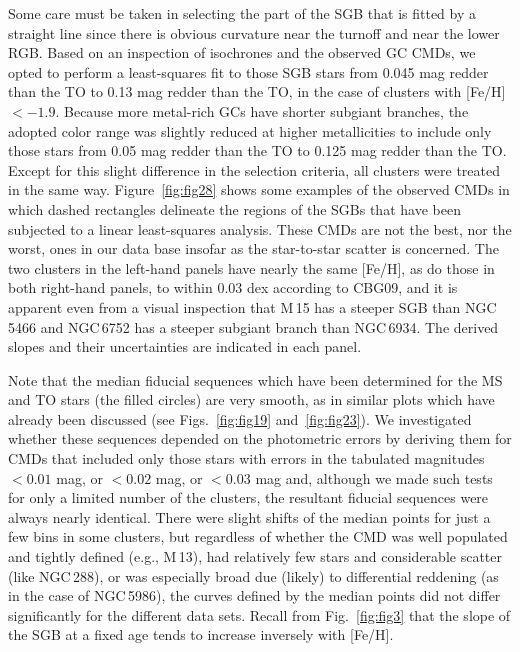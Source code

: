 \documentclass[12pt,preprint]{aastex}
\begin{document}
Some care must be taken in selecting the part of the SGB that is fitted by a
straight line since there is obvious curvature near the turnoff and near the
lower RGB.  Based on an inspection of isochrones and the observed GC CMDs, we
opted to perform a least-squares fit to those SGB stars from 0.045 mag redder
than the TO to 0.13 mag redder than the TO, in the case of clusters with [Fe/H]
$< -1.9$.  Because more metal-rich GCs have shorter subgiant branches, the
adopted color range was slightly reduced at higher metallicities to include
only those stars from 0.05 mag redder than the TO to 0.125 mag redder than the
TO.  Except for this slight difference in the selection criteria, all clusters
were treated in the same way.  Figure~\ref{fig:fig28} shows some examples of
the observed CMDs in which dashed rectangles delineate the regions of the SGBs
that have been subjected to a linear least-squares analysis.  These CMDs are
not the best, nor the worst, ones in our data base insofar as the star-to-star
scatter is concerned.  The two clusters in the left-hand panels have nearly
the same [Fe/H], as do those in both right-hand panels, to within 0.03 dex
according to CBG09, and it is apparent even from a visual inspection that
M$\,$15 has a steeper SGB than NGC$\,$5466 and NGC$\,$6752 has a steeper
subgiant branch than NGC$\,$6934.  The derived slopes and their uncertainties
are indicated in each panel.

Note that the median fiducial sequences which have been determined for the MS
and TO stars (the filled circles) are very smooth, as in similar plots which
have already been discussed (see Figs.~\ref{fig:fig19} and~\ref{fig:fig23}).
We investigated whether these sequences depended on the photometric errors by
deriving them for CMDs that included only those stars with errors in the
tabulated magnitudes $< 0.01$ mag, or $< 0.02$ mag, or $< 0.03$ mag and,
although we made such tests for only a limited number of the clusters, the
resultant fiducial sequences were always nearly identical.  There were slight
shifts of the median points for just a few bins in some clusters, but regardless
of whether the CMD was well populated and tightly defined (e.g., M$\,$13), had
relatively few stars and considerable scatter (like NGC$\,$288), or was
especially broad due (likely) to differential reddening (as in the case of
NGC$\,$5986), the curves defined by the median points did not differ
significantly for the  different data sets.  Recall from Fig.~\ref{fig:fig3}
that the slope of the SGB at a fixed age tends to increase inversely with
[Fe/H].
\end{document}
